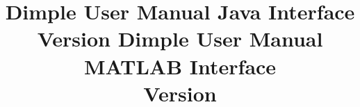 \documentclass[11pt, oneside]{article}   	%
\title{\huge \bfseries Dimple User Manual \linebreak Java Interface \\ \normalfont \large Version \version}
\title{\huge \bfseries Dimple User Manual \linebreak MATLAB Interface \\ \normalfont \large Version \version}
\newif\ifmatlab
\begin{document}
\maketitle




\clearpage
\setcounter{tocdepth}{5}				%
\tableofcontents

\clearpage







\begin{appendices}

\ifmatlab

\fi
\end{appendices}
\end{document}
